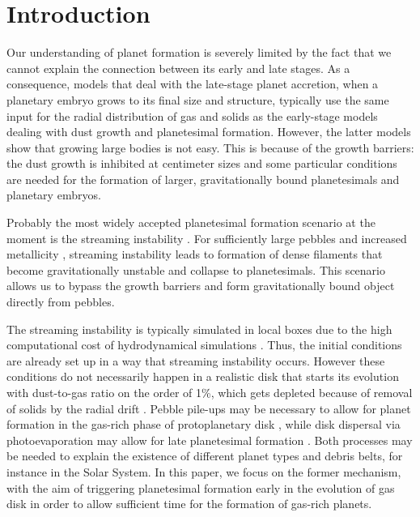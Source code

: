 \documentclass{aa}
\begin{document}

   \maketitle
%

\section{Introduction}

Our understanding of planet formation is severely limited by the fact that we cannot explain the connection between its early and late stages. As a consequence, models that deal with the late-stage planet accretion, when a planetary embryo grows to its final size and structure, typically use the same input for the radial distribution of gas and solids as the early-stage models dealing with dust growth and planetesimal formation. However, the latter models show that growing large bodies is not easy. This is because of the growth barriers: the dust growth is inhibited at centimeter sizes and some particular conditions are needed for the formation of larger, gravitationally bound planetesimals and planetary embryos. 

Probably the most widely accepted planetesimal formation scenario at the moment is the streaming instability \citep{2005ApJ...620..459Y, 2007Natur.448.1022J}. For sufficiently large pebbles and increased metallicity \citep{2010ApJ...722.1437B, 2014A&A...572A..78D, 2015A&A...579A..43C}, streaming instability leads to formation of dense filaments that become gravitationally unstable and collapse to planetesimals. This scenario allows us to bypass the growth barriers and form gravitationally bound object directly from pebbles. 

The streaming instability is typically simulated in local boxes due to the high computational cost of hydrodynamical simulations \citep{2011A&A...529A..62J, 2013MNRAS.434.1460K, 2016ApJ...822...55S}. Thus, the initial conditions are already set up in a way that streaming instability occurs. However these conditions do not necessarily happen in a realistic disk that starts its evolution with dust-to-gas ratio on the order of 1\%, which gets depleted because of removal of solids by the radial drift \citep{2010A&A...513A..79B,2012MNRAS.423..389H,2016A&A...586A..20K}. Pebble pile-ups may be necessary to allow for planet formation in the gas-rich phase of protoplanetary disk \citep{2016A&A...594A.105D, 2017MNRAS.467.1984G}, while disk dispersal via photoevaporation may allow for late planetesimal formation \citep{2017ApJ...839...16C}. Both processes may be needed to explain the existence of different planet types and debris belts, for instance in the Solar System. In this paper, we focus on the former mechanism, with the aim of triggering planetesimal formation early in the evolution of gas disk in order to allow sufficient time for the formation of gas-rich planets. 
\end{document}
